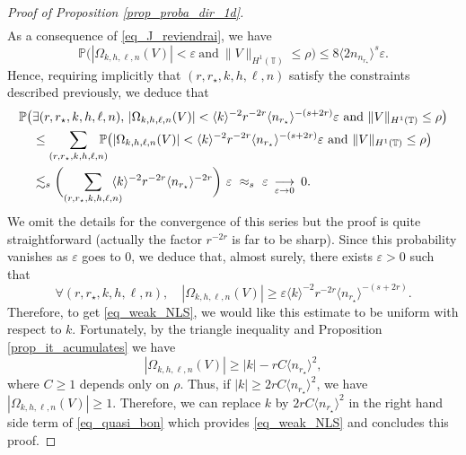 \documentclass[JEP,XML,SOM,Unicode,NoEqCountersInSection,published]{cedram}
\theoremstyle{definition}
\begin{document}
\begin{proof}[Proof of Proposition \ref{prop_proba_dir_1d}]
\begin{multline*}
\end{multline*}
As a consequence of \eqref{eq_J_reviendrai}, we have
\[
\mathbb{P}\big(|\Omega_{k,h,\ell,n}(V)| < \varepsilon \ \text{and} \ \| V\|_{H^1(\mathbb{T})} \leq \rho \big) \leq 8 \langle 2n_{n_{r_\star}} \rangle^{s} \varepsilon.
\]
Hence, requiring implicitly that $(r,r_\star,k,h,\ell,n)$ satisfy the constraints described previously, we deduce that
\begin{equation*}
\begin{split}
\mathbb{P}\big(&\exists (r,r_\star,k,h,\ell,n),\, |\Omega_{k,h,\ell,n}(V)| < \langle k \rangle^{-2} r^{-2r} \langle n_{r_\star} \rangle^{-(s+2r)} \varepsilon \text{ and } \| V\|_{H^1(\mathbb{T})} \leq \rho \big) \\
&\leq \sum_{(r,r_\star,k,h,\ell,n)}\hspace*{-3mm} \mathbb{P}\big(|\Omega_{k,h,\ell,n}(V)| < \langle k \rangle^{-2} r^{-2r} \langle n_{r_\star} \rangle^{-(s+2r)} \varepsilon \text{ and } \| V\|_{H^1(\mathbb{T})} \leq \rho \big) \\
&\lesssim_s \biggl(\sum_{(r,r_\star,k,h,\ell,n)}\hspace*{-3mm} \langle k \rangle^{-2} r^{-2r} \langle n_{r_\star} \rangle^{-2r} \biggr) \ \varepsilon \ \approx_s \ \varepsilon \ \mathop{\longrightarrow}_{\varepsilon \to 0} \ 0.
\end{split}
\end{equation*}
We omit the details for the convergence of this series but the proof is quite straightforward (actually the factor $r^{-2r}$ is far to be sharp). Since this probability vanishes as $\varepsilon$ goes to $0$, we deduce that, almost surely, there exists $\varepsilon>0$ such that
\begin{equation}
\label{eq_quasi_bon}
\forall (r,r_\star,k,h,\ell,n), \quad |\Omega_{k,h,\ell,n}(V)| \geq \varepsilon \langle k \rangle^{-2} r^{-2r} \langle n_{r_\star} \rangle^{-(s+2r)}.
\end{equation}
Therefore, to get \eqref{eq_weak_NLS}, we would like this estimate to be uniform with respect to $k$. Fortunately, by the triangle inequality and Proposition \ref{prop_it_acumulates} we have
\[
|\Omega_{k,h,\ell,n}(V)| \geq |k| - r C \langle n_{r_\star} \rangle^{2},
\]
where $C\geq 1$ depends only on $\rho$. Thus, if $|k|\geq 2 r C \langle n_{r_\star} \rangle^{2}$, we have $|\Omega_{k,h,\ell,n}(V)| \geq 1$. Therefore, we can replace $k$ by $ 2 r C \langle n_{r_\star} \rangle^{2}$ in the right hand side term of \eqref{eq_quasi_bon} which provides \eqref{eq_weak_NLS} and concludes this proof.
\end{proof}
\end{document}
